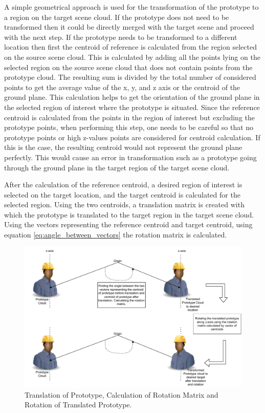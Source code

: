 A simple geometrical approach is used for the transformation of the prototype to a region on the target scene cloud. If the prototype does not need to be transformed then it could be directly merged with the target scene and proceed with the next step. If the prototype needs to be transformed to a different location then first the centroid of reference is calculated from the region selected on the source scene cloud. This is calculated by adding all the points lying on the selected region on the source scene cloud that does not contain points from the prototype cloud. The resulting sum is divided by the total number of considered points to get the average value of the x, y, and z axis or the centroid of the ground plane. This calculation helps to get the orientation of the ground plane in the selected region of interest where the prototype is situated. Since the reference centroid is calculated from the points in the region of interest but excluding the prototype points, when performing this step, one needs to be careful so that no prototype points or high z-values points are considered for centroid calculation. If this is the case, the resulting centroid would not represent the ground plane perfectly. This would cause an error in transformation such as a prototype going through the ground plane in the target region of the target scene cloud.

After the calculation of the reference centroid, a desired region of interest is selected on the target location, and the target centroid is calculated for the selected region. Using the two centroids, a translation matrix is created with which the prototype is translated to the target region in the target scene cloud. Using the vectors representing the reference centroid and target centroid, using equation \ref{eq:angle_between_vectors} the rotation matrix is calculated.

\begin{figure}[htbp]
    \centering
    \includegraphics[width=1\linewidth]{97_graphics/concepts/rotational_matrix_calculation.pdf}
    \caption{Translation of Prototype, Calculation of Rotation Matrix and Rotation of Translated Prototype.}
    \label{fig:rotation_matrix_calculation}
\end{figure}

